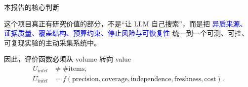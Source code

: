 \begin{frame}{本报告的核心判断}
\begin{center}
\begin{minipage}{0.88\textwidth}
\Large
这个项目真正有研究价值的部分，不是“让 LLM 自己搜索”，而是把
\textcolor{Blue}{异质来源、证据质量、覆盖结构、预算约束、停止风险与可恢复性}
统一到一个可测、可控、可复现实验的主动采集系统中。
\end{minipage}
\end{center}

\vspace{1.2em}
\begin{block}{因此，评价函数必须从 volume 转向 value}
\scriptsize
\[
\begin{aligned}
U_{intel}&\neq \#\text{items},\\
U_{intel}&=f(\text{precision},\text{coverage},\text{independence},\text{freshness},\text{cost}).
\end{aligned}
\]
\end{block}
\end{frame}
